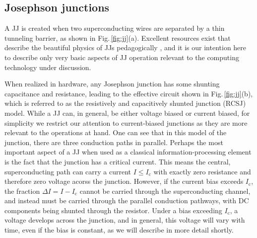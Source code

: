 \documentclass[twocolumn]{article}
\begin{document}
\subsection{Josephson junctions}
\begin{figure} 
\end{figure}
A JJ is created when two superconducting wires are separated by a thin tunneling barrier, as shown in Fig.\,\ref{fig:jj}(a). Excellent resources exist that describe the beautiful physics of JJs pedagogically \cite{ti1996,vatu1998,ka1999}, and it is our intention here to describe only very basic aspects of JJ operation relevant to the computing technology under discussion. 

When realized in hardware, any Josephson junction has some shunting capacitance and resistance, leading to the effective circuit shown in Fig.\,\ref{fig:jj}(b), which is referred to as the resistively and capacitively shunted junction (RCSJ) model. While a JJ can, in general, be either voltage biased or current biased, for simplicity we restrict our attention to current-biased junctions as they are more relevant to the operations at hand. One can see that in this model of the junction, there are three conduction paths in parallel. Perhaps the most important aspect of a JJ when used as a classical information-processing element is the fact that the junction has a critical current. This means the central, superconducting path can carry a current $I\le I_{\mathrm{c}}$ with exactly zero resistance and therefore zero voltage acorss the junction. However, if the current bias exceeds $I_{\mathrm{c}}$, the fraction $\Delta I = I-I_{\mathrm{c}}$ cannot be carried through the superconducting channel, and instead must be carried through the parallel conduction pathways, with DC components being shunted through the resistor. Under a bias exceeding $I_{\mathrm{c}}$, a voltage develops across the junction, and in general, this voltage will vary with time, even if the bias is constant, as we will describe in more detail shortly. 
\end{document}
